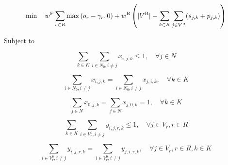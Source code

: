 \begin{linenomath}
    \begin{equation}
        \min \quad w^{\text{F}} \sum_{r \in R} \max\left(o_r - \gamma_r, 0\right) + w^{\text{B}}\left(|V^{\text{B}}| - \sum_{k \in K}\sum_{j \in V^{\text{B}}}(s_{j,k} + p_{j,k})\right) \label{eq:objective}
    \end{equation}
\end{linenomath}

\noindent Subject to

\begin{linenomath}
    \begin{equation}
        \sum_{k \in K}\sum_{i \in N_0, i \neq j} x_{i,j,k} \leq 1, \quad \forall j \in N \label{eq:regional_visit}
    \end{equation}

\end{linenomath}

\begin{linenomath}
    \begin{equation}
        \sum_{i \in N_0, i \neq j} x_{i,j,k} = \sum_{i \in N_0, i \neq j} x_{j,i,k}, \quad \forall k \in K \label{eq:truck_flow}
    \end{equation}

\end{linenomath}

\begin{linenomath}
    \begin{equation}
        \sum_{j \in N} x_{0,j,k} = \sum_{j \in N} x_{j,0,k} = 1, \quad \forall k \in K \label{eq:depot_flow}
    \end{equation}

\end{linenomath}

\begin{linenomath}
    \begin{equation}
        \sum_{k \in K}\sum_{i \in V^0_r, i \neq j} y_{i,j,r,k} \leq 1, \quad \forall j \in V_r, r \in R \label{eq:bike_visit}
    \end{equation}
\end{linenomath}

\begin{linenomath}
    \begin{equation}
        \sum_{i \in V^0_r, i \neq j} y_{i,j,r,k} = \sum_{i \in V^0_r, i \neq j} y_{j,i,r,k}, \quad \forall j \in V_r, r \in R, k \in K \label{eq:laborer_flow}
    \end{equation}
\end{linenomath}


